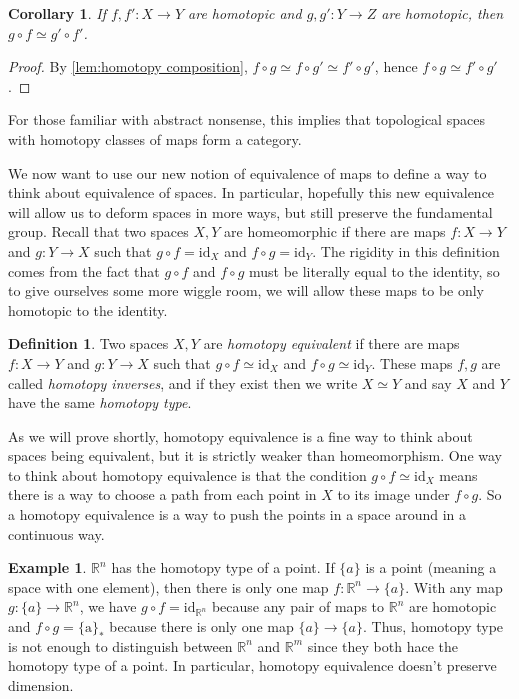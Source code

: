 \documentclass{article}
\newtheorem{cor}[thm]{Corollary}
\theoremstyle{definition}
\newtheorem{defi}[thm]{Definition}
\newtheorem{exa}[thm]{Example}
\theoremstyle{remark}
\newcommand{\R}{\mathbb R}
\numberwithin{figure}{section}
\begin{document}
\begin{cor}
	If $f, f' : X \to Y$ are homotopic and $g, g' : Y \to Z$ are homotopic, then $g \circ f \simeq g' \circ f'$.
\end{cor}

\begin{proof}
	By \cref{lem:homotopy composition}, $f \circ g \simeq f \circ g' \simeq f' \circ g'$, hence $f \circ g \simeq f' \circ g'$.
\end{proof}

For those familiar with abstract nonsense, this implies that topological spaces with homotopy classes of maps form a category.

We now want to use our new notion of equivalence of maps to define a way to think about equivalence of spaces. In particular, hopefully this new equivalence will allow us to deform spaces in more ways, but still preserve the fundamental group. Recall that two spaces $X, Y$ are homeomorphic if there are maps $f : X \to Y$ and $g : Y \to X$ such that $g \circ f = \mathrm{id}_X$ and $f \circ g = \mathrm{id}_Y$. The rigidity in this definition comes from the fact that $g \circ f$ and $f \circ g$ must be literally equal to the identity, so to give ourselves some more wiggle room, we will allow these maps to be only homotopic to the identity.

\begin{defi}
	Two spaces $X, Y$ are \emph{homotopy equivalent} if there are maps $f : X \to Y$ and $g : Y \to X$ such that $g \circ f \simeq \mathrm{id}_X$ and $f \circ g \simeq \mathrm{id}_Y$. These maps $f, g$ are called \emph{homotopy inverses}, and if they exist then we write $X \simeq Y$ and say $X$ and $Y$ have the same \emph{homotopy type}.
\end{defi}

As we will prove shortly, homotopy equivalence is a fine way to think about spaces being equivalent, but it is strictly weaker than homeomorphism. One way to think about homotopy equivalence is that the condition $g \circ f \simeq \mathrm{id}_X$ means there is a way to choose a path from each point in $X$ to its image under $f \circ g$. So a homotopy equivalence is a way to push the points in a space around in a continuous way.

\begin{exa}
	$\R^n$ has the homotopy type of a point. If $\{a\}$ is a point (meaning a space with one element), then there is only one map $f : \R^n \to \{a\}$. With any  map $g : \{a\} \to \R^n$, we have $g \circ f = \mathrm{id}_{\R^n}$ because any pair of maps to $\R^n$ are homotopic and $f \circ g = \mathrm{\{a\}}_*$ because there is only one map $\{a\} \to \{a\}$. Thus, homotopy type is not enough to distinguish between $\R^n$ and $\R^m$ since they both hace the homotopy type of a point. In particular, homotopy equivalence doesn't preserve dimension.
\end{exa}
\end{document}
